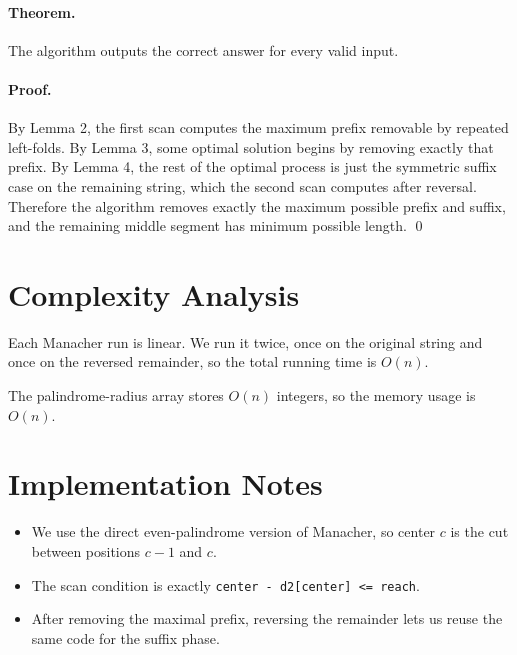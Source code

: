 \documentclass[11pt]{article}
\begin{document}
\paragraph{Theorem.}
The algorithm outputs the correct answer for every valid input.

\paragraph{Proof.}
By Lemma 2, the first scan computes the maximum prefix removable by repeated left-folds.
By Lemma 3, some optimal solution begins by removing exactly that prefix.
By Lemma 4, the rest of the optimal process is just the symmetric suffix case on the remaining string, which
the second scan computes after reversal.
Therefore the algorithm removes exactly the maximum possible prefix and suffix, and the remaining middle
segment has minimum possible length. \qed

\section*{Complexity Analysis}

Each Manacher run is linear.
We run it twice, once on the original string and once on the reversed remainder, so the total running time is
$O(n)$.

The palindrome-radius array stores $O(n)$ integers, so the memory usage is $O(n)$.

\section*{Implementation Notes}

\begin{itemize}[leftmargin=*]
    \item We use the direct even-palindrome version of Manacher, so center $c$ is the cut between
    positions $c-1$ and $c$.
    \item The scan condition is exactly \texttt{center - d2[center] <= reach}.
    \item After removing the maximal prefix, reversing the remainder lets us reuse the same code for the suffix
    phase.
\end{itemize}
\end{document}
